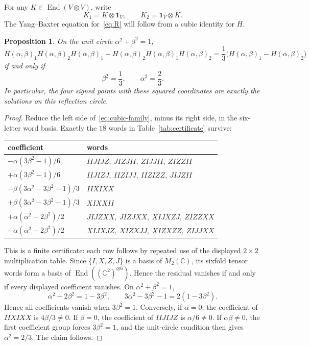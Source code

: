 \documentclass[11pt]{article}
\newtheorem{proposition}[theorem]{Proposition}
\theoremstyle{remark}
\newcommand{\Id}{\mathbf 1}
\newcommand{\End}{\operatorname{End}}
\newcommand{\bbC}{\mathbb C}
\begin{document}
For any \(K\in\End(V\otimes V)\), write
\[
  K_1=K\otimes\Id_V,\qquad K_2=\Id_V\otimes K.
\]
The Yang--Baxter equation for~\eqref{eq:R} will follow from a cubic identity
for \(H\).

\begin{proposition}\label{prop:circle}
On the unit circle \(\alpha^2+\beta^2=1\),
\begin{equation}
  H(\alpha,\beta)_1H(\alpha,\beta)_2H(\alpha,\beta)_1
  -
  H(\alpha,\beta)_2H(\alpha,\beta)_1H(\alpha,\beta)_2
  =
  \frac13\bigl(H(\alpha,\beta)_1-H(\alpha,\beta)_2\bigr)
  \label{eq:cubic-family}
\end{equation}
if and only if
\[
  \beta^2=\frac13,\qquad\alpha^2=\frac23.
\]
In particular, the four signed points with these squared coordinates are
exactly the solutions on this reflection circle.
\end{proposition}

\begin{proof}
Reduce the left side of~\eqref{eq:cubic-family}, minus its right side, in
the six-letter word basis.  Exactly the \(18\) words in
Table~\ref{tab:certificate} survive:
\begin{center}
\small
{}
\label{tab:certificate}
\renewcommand{\arraystretch}{1.16}
\begin{tabular}{>{\raggedright\arraybackslash}p{}
                >{\raggedright\arraybackslash}p{}}
\toprule
coefficient & words\\
\midrule
\(-\alpha(3\beta^2-1)/6\) &
\(IIJIJZ,\ JIZJII,\ ZIJJII,\ ZIZZII\)\\
\(+\alpha(3\beta^2-1)/6\) &
\(IIJIZJ,\ IIZIJJ,\ IIZIZZ,\ JIJZII\)\\
\(-\beta(3\alpha^2-3\beta^2-1)/3\) &
\(IIXIXX\)\\
\(+\beta(3\alpha^2-3\beta^2-1)/3\) &
\(XIXXII\)\\
\(+\alpha(\alpha^2-2\beta^2)/2\) &
\(JIJZXX,\ JIZJXX,\ XIJXZJ,\ ZIZZXX\)\\
\(-\alpha(\alpha^2-2\beta^2)/2\) &
\(XIJXJZ,\ XIZXJJ,\ XIZXZZ,\ ZIJJXX\)\\
\bottomrule
\end{tabular}
\end{center}
This is a finite certificate: each row follows by repeated use of the
displayed \(2\times2\) multiplication table.  Since \(\{I,X,Z,J\}\) is a
basis of \(M_2(\bbC)\), its sixfold tensor words form a basis of
\(\End((\bbC^2)^{\otimes6})\).  Hence the residual vanishes if and only if
every displayed coefficient vanishes.  On
\(\alpha^2+\beta^2=1\),
\[
  \alpha^2-2\beta^2=1-3\beta^2,\qquad
  3\alpha^2-3\beta^2-1=2(1-3\beta^2).
\]
Hence all coefficients vanish when \(3\beta^2=1\).  Conversely, if
\(\alpha=0\), the coefficient of \(IIXIXX\) is
\(4\beta/3\ne0\).  If \(\beta=0\), the coefficient of \(IIJIJZ\) is
\(\alpha/6\ne0\).  If \(\alpha\beta\ne0\), the first coefficient group forces
\(3\beta^2=1\), and the unit-circle condition then gives
\(\alpha^2=2/3\).  The claim follows.
\end{proof}
\end{document}
